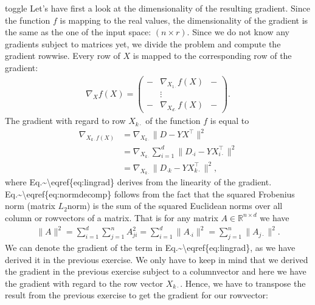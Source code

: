 \documentclass[letterpaper,10pt,english]{jupyterBook}
\begin{document}
\begin{enumerate}
\begin{sphinxuseclass}{toggle}
\sphinxAtStartPar
Let’s have first a look at the dimensionality of the resulting gradient. Since the function \(f\) is mapping to the real values, the dimensionality of the gradient is the same as the one of the input space: \((n\times r)\). Since we do not know any gradients subject to matrices yet, we divide the problem and compute the gradient row\sphinxhyphen{}wise. Every row of \(X\) is mapped to the corresponding row of the gradient:
\label{equation:optimization_exercises:57931ea6-ec46-4d77-94a1-ebd5400dc618}\begin{align}
    \nabla_Xf(X) = \begin{pmatrix}
- &\nabla_{X_{1\cdot }}f(X) &-\\&\vdots&\\-&\nabla_{X_{d\cdot }}f(X)&-\end{pmatrix}.\label{eq:gradX}
\end{align}
\sphinxAtStartPar
The gradient with regard to  row \(X_{ k\cdot}\) of the function \(f\) is equal to
\label{equation:optimization_exercises:c53e46ff-7cdb-469c-a105-b6d9f9a1201a}\begin{align}
    \nabla_{X_{k \cdot }f(X)} &= \nabla_{X_{k \cdot }}\lVert D-YX^\top\rVert^2\nonumber\\
    &= \nabla_{X_{k\cdot }}\sum_{i=1}^d\lVert D_{\cdot i}-YX_{i\cdot }^\top\rVert^2\label{eq:normdecomp}\\ 
    &= \nabla_{X_{k\cdot }}\lVert D_{\cdot k}-YX_{k\cdot }^\top\rVert^2, \label{eq:lingrad}
\end{align}
\sphinxAtStartPar
where Eq.\textasciitilde{}\textbackslash{}eqref\{eq:lingrad\}  derives from the linearity of the gradient. Eq.\textasciitilde{}\textbackslash{}eqref\{eq:normdecomp\} follows from the fact that the squared Frobenius norm (matrix \(L_2\)\sphinxhyphen{}norm) is the sum of the squared Euclidean norms over all column\sphinxhyphen{} or row\sphinxhyphen{}vectors of a matrix. That is for any matrix \(A\in\mathbb{R}^{n\times d}\) we have
\begin{align*}
    \lVert A\rVert^2 =\sum_{i=1}^d\sum_{j=1}^n A_{ji}^2 
    = \sum_{i=1}^d\lVert A_{\cdot i}\rVert^2 
    = \sum_{j=1}^n\lVert A_{j\cdot}\rVert^2. 
\end{align*}
\sphinxAtStartPar
We can denote the gradient of the term in Eq.\textasciitilde{}\textbackslash{}eqref\{eq:lingrad\}, as we have derived it in the previous exercise. We only have to keep in mind that we derived the gradient in the previous exercise subject to a column\sphinxhyphen{}vector and here we have the gradient with regard to the row vector \(X_{k\cdot}\). Hence, we have to transpose the result from the previous exercise to get the gradient for our row\sphinxhyphen{}vector:

\end{sphinxuseclass}
\end{enumerate}
\end{document}

